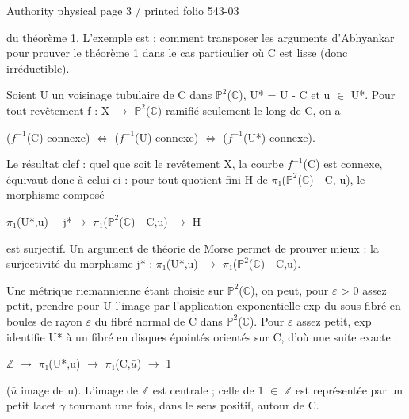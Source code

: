 \documentclass[10pt,a4paper]{article}
\begin{document}
\noindent\begin{adjustbox}{max totalsize={\textwidth}{0.945\textheight},center}
\begin{minipage}{\textwidth}
\noindent\hfill\scriptsize Authority physical page 3 / printed folio 543-03\par\normalsize
\noindent du théorème 1. L'exemple est : comment transposer les arguments d'Abhyankar pour prouver le théorème 1 dans le cas particulier où C est lisse (donc irréductible).\par\smallskip
\noindent Soient U un voisinage tubulaire de C dans \ensuremath{ℙ^2}(\ensuremath{ℂ}), U* = U - C et u \ensuremath{∈} U*. Pour tout revêtement f : X \ensuremath{→} \ensuremath{ℙ^2}(\ensuremath{ℂ}) ramifié seulement le long de C, on a\par\smallskip
\noindent (\ensuremath{f^{-1}}(C) connexe) \ensuremath{⇔} (\ensuremath{f^{-1}}(U) connexe) \ensuremath{⇔} (\ensuremath{f^{-1}}(U*) connexe).\par\smallskip
\noindent Le résultat clef : quel que soit le revêtement X, la courbe \ensuremath{f^{-1}}(C) est connexe, équivaut donc à celui-ci : pour tout quotient fini H de \ensuremath{π₁}(\ensuremath{ℙ^2}(\ensuremath{ℂ}) - C, u), le morphisme composé\par\smallskip
\noindent \ensuremath{π₁}(U*,u) —j*\ensuremath{→} \ensuremath{π₁}(\ensuremath{ℙ^2}(\ensuremath{ℂ}) - C,u) \ensuremath{→} H\par\smallskip
\noindent est surjectif. Un argument de théorie de Morse permet de prouver mieux : la surjectivité du morphisme j* : \ensuremath{π₁}(U*,u) \ensuremath{→} \ensuremath{π₁}(\ensuremath{ℙ^2}(\ensuremath{ℂ}) - C,u).\par\smallskip
\noindent Une métrique riemannienne étant choisie sur \ensuremath{ℙ^2}(\ensuremath{ℂ}), on peut, pour \ensuremath{ε} > 0 assez petit, prendre pour U l'image par l'application exponentielle exp du sous-fibré en boules de rayon \ensuremath{ε} du fibré normal de C dans \ensuremath{ℙ^2}(\ensuremath{ℂ}). Pour \ensuremath{ε} assez petit, exp identifie U* à un fibré en disques épointés orientés sur C, d'où une suite exacte :\par\smallskip
\noindent \ensuremath{ℤ} \ensuremath{→} \ensuremath{π₁}(U*,u) \ensuremath{→} \ensuremath{π₁}(C,\ensuremath{\bar{u}}) \ensuremath{→} 1\par\smallskip
\noindent (\ensuremath{\bar{u}} image de u). L'image de \ensuremath{ℤ} est centrale ; celle de 1 \ensuremath{∈} \ensuremath{ℤ} est représentée par un petit lacet \ensuremath{γ} tournant une fois, dans le sens positif, autour de C.\par\smallskip

\end{minipage}
\end{adjustbox}
\end{document}
